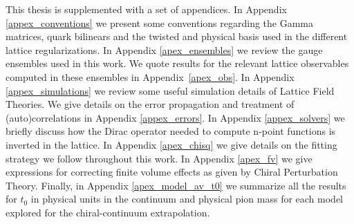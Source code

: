 This thesis is supplemented with a set of appendices. In Appendix \ref{appex_conventions} we present some conventions regarding the Gamma matrices, quark bilinears and the twisted and physical basis used in the different lattice regularizations. In Appendix \ref{apex_ensembles} we review the gauge ensembles used in this work. We quote results for the relevant lattice observables computed in these ensembles in Appendix~\ref{apex_obs}. In Appendix \ref{appex_simulations} we review some useful simulation details of Lattice Field Theories. We give details on the error propagation and treatment of (auto)correlations in Appendix \ref{appex_errors}. In Appendix \ref{appex_solvers} we briefly discuss how the Dirac operator needed to compute n-point functions is inverted in the lattice. In Appendix \ref{apex_chisq} we give details on the fitting strategy we follow throughout this work. In Appendix \ref{apex_fv} we give expressions for correcting finite volume effects as given by Chiral Perturbation Theory. Finally, in Appendix \ref{apex_model_av_t0} we summarize all the results for $t_0$ in physical units in the continuum and physical pion mass for each model explored for the chiral-continuum extrapolation.

